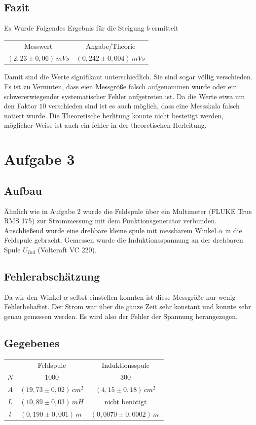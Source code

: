 \documentclass{article}
\begin{document}
\subsection{Fazit}
Es Wurde Folgendes Ergebnis für die Steigung \(b\) ermittelt
\begin{center}
\begin{tabular}{c c} 
 Messwert & Angabe/Theorie \\
 \( (2,23 \pm 0,06)\, mVs \) & \( (0,242 \pm 0,004)\, mVs \) \\
 \end{tabular}
\end{center}
Damit sind die Werte signifikant unterschiedlich. Sie sind sogar völlig verschieden. Es ist zu Vermuten, dass eien Messgröße falsch aufgenommen wurde oder ein schwererwiegender systematischer Fehler aufgetreten ist. Da die Werte etwa um den Faktor \(10\) verschieden sind ist es auch möglich, dass eine Messskala falsch notiert wurde. Die Theoretische herlitung konnte nicht bestetigt werden, möglicher Weise ist auch ein fehler in der theoretischen Herleitung.

\section{Aufgabe 3}
\subsection{Aufbau}
Ähnlich wie in Aufgabe 2 wurde die Feldspule über ein Multimeter (FLUKE True RMS 175) zur Strommessung mit dem Funktionsgenerator verbunden. Anschließend wurde eine drehbare kleine spule mit messbarem Winkel \( \alpha \) in die Feldspule gebracht. Gemessen wurde die Induktionsspannung an der drehbaren Spule \( U_{Ind} \) (Voltcraft VC 220).
\subsection{Fehlerabschätzung}
Da wir den Winkel \( \alpha \) selbst einstellen konnten ist diese Messgröße nur wenig Fehlerbehaftet. Der Strom war über die ganze Zeit sehr konstant und konnte sehr genau gemessen werden. Es wird also der Fehler der Spannung herangezogen.
\subsection{Gegebenes}
\begin{center}
\begin{tabular}{c c c}
 & Feldspule & Induktionsspule \\
 \(N\) & \(1000\) & \(300\) \\
 \(A\) & \((19,73 \pm 0,02)\, cm^2\) & \((4,15 \pm 0,18)\, cm^2\) \\
 \(L\) & \((10,89 \pm 0,03)\, mH \) & nicht benötigt \\
 \(l\) & \((0,190 \pm 0,001)\, m\ \) & \((0,0070 \pm 0,0002)\, m\ \) \\
\end{tabular}
\end{center}
\end{document}

